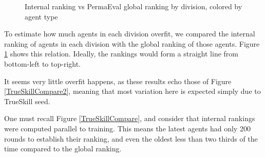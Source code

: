 \begin{figure}[H]
{}
\caption{Internal ranking vs PermaEval global ranking by division, colored by agent type}
\label{DivisionConsistency}
\end{figure}

To estimate how much agents in each division overfit, we compared the internal ranking of agents in each division with the global ranking of those agents. Figure \ref{DivisionConsistency} shows this relation. Ideally, the rankings would form a straight line from bottom-left to top-right.

It seems very little overfit happens, as these results echo those of Figure \ref{TrueSkillCompare2}, meaning that most variation here is expected simply due to TrueSkill seed.

One must recall Figure \ref{TrueSkillCompare}, and consider that internal rankings were computed parallel to training. This means the latest agents had only 200 rounds to establish their ranking, and even the oldest less than two thirds of the time compared to the global ranking.